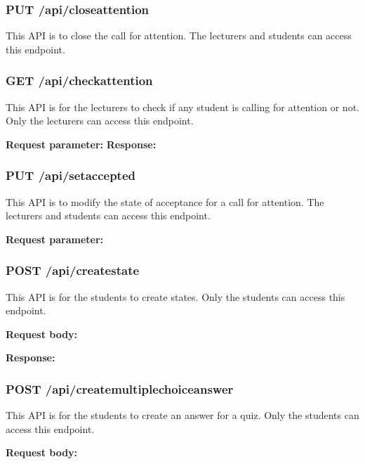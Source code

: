 \documentclass[a4paper, 11pt,openany]{book} %
\begin{document}
\subsubsection{PUT /api/closeattention}
This API is to close the call for attention. The lecturers and students can access this endpoint. \par

\subsubsection{GET /api/checkattention}
This API is for the lecturers to check if any student is calling for attention or not. Only the lecturers can access this endpoint. \par
\textbf{Request parameter:}
\textbf{Response:}

\subsubsection{PUT /api/setaccepted}
This API is to modify the state of acceptance for a call for attention. The lecturers and students can access this endpoint. \par
\textbf{Request parameter:}

\subsubsection{POST /api/createstate}
This API is for the students to create states. Only the students can access this endpoint. \par
\textbf{Request body:}

\textbf{Response:}
\subsubsection{POST /api/createmultiplechoiceanswer}
This API is for the students to create an answer for a quiz. Only the students can access this endpoint. \par
\textbf{Request body:}
\end{document}
